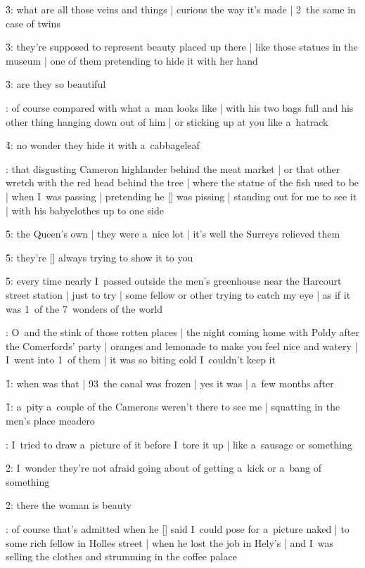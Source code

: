 \f3:
what are all those veins and things |
curious the way it's made |
2~the same in case of twins

\f3:
they're supposed to represent beauty placed up there |
like those statues in the museum |
one of them pretending to hide it with her hand

\f3:
are they so beautiful

:
of course compared with what a~man looks like |
with his two bags full and his other thing hanging down out of him |
or sticking up at you like a~hatrack

\f4:
no wonder they hide it with a~cabbageleaf

:
that disgusting Cameron highlander behind the meat market |
or that other wretch with the red head behind the tree |
where the statue of the fish used to be |
when I~was passing |
pretending he [\redhead] was pissing |
standing out for me to see it |
with his babyclothes up to one side

\f5:
the Queen's own |
they were a~nice lot |
it's well the Surreys relieved them

\f5:
they're [\men] always trying to show it to you

\f5:
every time nearly I~passed outside the men's greenhouse
near the Harcourt street station |
just to try |
some fellow or other trying to catch my eye |
as if it was 1~of the 7~wonders of the world

:
O~and the stink of those rotten places |
the night coming home with Poldy after the Comerfords' party |
oranges and lemonade to make you feel nice and watery |
I~went into 1~of them |
it was so biting cold I~couldn't keep it

\f1:
when was that |
93~the canal was frozen |
yes it was |
a~few months after

\f1:
a~pity a~couple of the Camerons weren't there to see me |
squatting in the men's place meadero

:
I~tried to draw a~picture of it before I~tore it up |
like a~sausage or something

\f2:
I~wonder they're not afraid going about of getting a~kick or a~bang of something

\f2:
there the woman is beauty

:
of course that's admitted when he [\bloom] said I~could pose for a~picture naked |
to some rich fellow in Holles street |
when he lost the job in Hely's |
and I~was selling the clothes and strumming in the coffee palace

